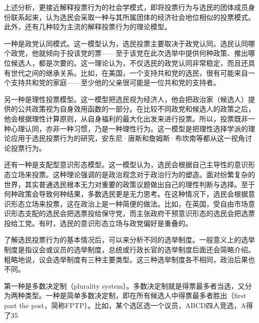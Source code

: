 上述分析，更接近解释投票行为的社会学模式，即将投票行为与选民的团体成员身份联系起来，认为选民会采取一种与其所属团体的经济社会地位相似的投票模式。此外，还有几种较为主流的解释投票行为的理论模型。

一种是政党认同模式。这一模型认为，选民投票主要取决于政党认同。选民认同哪个政党，他就倾向于投该党的票——至于该党在此次选举中提供何种政策、推出哪位候选人，都是次要的。这一理论认为，不仅选民的政党认同非常稳定，而且还具有世代之间的继承关系。比如，在美国，一个支持共和党的选民，很有可能来自一个支持共和党的家庭——至少他的父亲很可能是一位共和党的支持者。

另一种是理性投票模型。这一模型把选民视为经济人，他会把政治家（候选人）提供的公共政策视为自身效用函数的一部分。在比较不同政党和候选人的政策之后，他会根据理性计算原则，从自身福利的最大化出发来进行投票。所以，投票既非一种心理认同，亦非一种习惯，乃是一种理性行为。这一模型是把理性选择学派的理论应用于选民投票行为的研究，安东尼·唐斯和詹姆斯·布坎南等都从这一视角讨论投票行为。

还有一种是支配型意识形态模型。这一模型认为，选民会根据自己主导性的意识形态立场来投票。这种理论强调的是政治观念对于政治行为的塑造。面对纷繁复杂的世界，其实普通选民根本无力对重要的政策议题做出自己的理性判断与选择。至于何种政策会导致何种结果，多数选民更是无力思考。在这种情况下，选民会根据意识形态立场来投票，这在政治上是一种简便的做法。比如，在英国，受自由市场意识形态支配的选民会把选票投给保守党，而主张政府干预意识形态的选民会把选票投给工党。有时，选民的意识形态立场与政党偏好是重叠的。


了解选民投票行为的基本情况后，可以来分析不同的选举制度。一般意义上的选举制度是指议会或议员的选举制度，总统或行政长官的选举制度后面还会简略介绍。粗略地说，议会选举制度有三种主要类型。这三种选举制度各不相同，政治后果也不同。

第一种是多数决定制（plurality system）。多数决定制就是得票最多者当选，又分为两种类型。一种是简单多数决定制，即在所有候选人中得票最多者胜出（first past the post，简称FPTP）。比如，某个选区选一个议员，ABCD四人竞选，A得了35%

